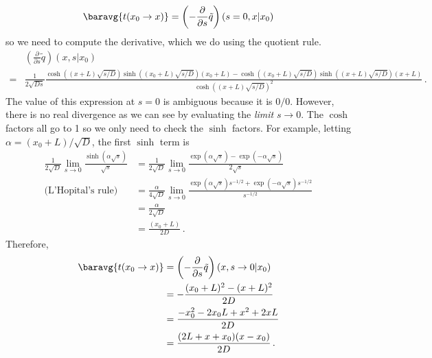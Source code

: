 \begin{equation*}
  \baravg{t(x_0 \rightarrow x)} = \left(- \frac{\partial}{\partial s} \tilde{q} \right) (s=0, x | x_0)
\end{equation*}
so we need to compute the derivative, which we do using the quotient rule.
\begin{align*}
  & \left( \frac{\partial}{\partial s} \tilde{q} \right)(x, s | x_0) \\
  =& \frac{1}{2 \sqrt{Ds}}
    \frac{\cosh((x + L) \sqrt{s/D})\sinh((x_0 + L) \sqrt{s/D}) (x_0 + L) - \cosh((x_0 + L)\sqrt{s/D})\sinh((x + L) \sqrt{s/D}) (x + L)}{\cosh((x + L) \sqrt{s/D})^2}
  \, .
\end{align*}
The value of this expression at $s=0$ is ambiguous because it is $0/0$.
However, there is no real divergence as we can see by evaluating the \emph{limit} $s \rightarrow 0$.
The $\cosh$ factors all go to 1 so we only need to check the $\sinh$ factors.
For example, letting $\alpha = (x_0 + L) / \sqrt{D}$, the first $\sinh$ term is
\begin{align*}
  \frac{1}{2 \sqrt{D}} \lim_{s \rightarrow 0} \frac{\sinh \left( \alpha \sqrt{s} \right)}{\sqrt{s}}
  &= \frac{1}{2 \sqrt{D}} \lim_{s \rightarrow 0}
  \frac{\exp \left( \alpha \sqrt{s} \right) - \exp \left( -\alpha \sqrt{s} \right)}{2 \sqrt{s}} \\
  \text{(L'Hopital's rule)} \quad &= \frac{\alpha}{4 \sqrt{D}} \lim_{s \rightarrow 0} \frac{\exp \left( \alpha \sqrt{s} \right)s^{-1/2} + \exp \left( -\alpha \sqrt{s} \right) s^{-1/2}}{s^{-1/2}}
  \\
  &= \frac{\alpha}{2 \sqrt{D}} \\
  &= \frac{(x_0 + L) }{2 D}
  \, .
\end{align*}
Therefore,
\begin{align*}
  \baravg{t(x_0 \rightarrow x)}
  &= \left( -\frac{\partial}{\partial s} \tilde{q}\right) (x, s \rightarrow 0 | x_0) \\
  &= -\frac{(x_0 + L)^2 - (x + L)^2}{2 D} \\
  &= \frac{-x_0^2 - 2 x_0 L + x^2 + 2 x L}{2 D} \\
  &= \frac{(2L + x + x_0)(x - x_0)}{2D}
  \, .
\end{align*}
